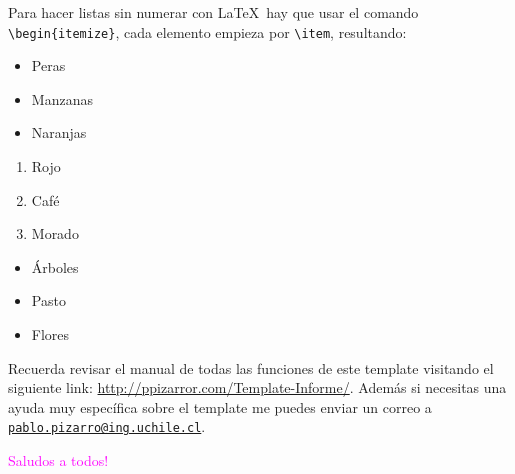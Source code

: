 		Para hacer listas sin numerar con \LaTeX\ hay que usar el comando \texttt{\textbackslash begin\{itemize\}}, cada elemento empieza por \texttt{\textbackslash item}, resultando:
		
		\begin{multicols}{3}
			\begin{itemize}[label={--}]
				\item Peras
				\item Manzanas
				\item Naranjas
			\end{itemize}
			
			\begin{enumerate}[label={*}]
				\item Rojo
				\item Café
				\item Morado
			\end{enumerate}
			
			\begin{itemize}
				\item Árboles
				\item Pasto
				\item Flores
			\end{itemize}
		\end{multicols}
		
		
		Recuerda revisar el manual de todas las funciones de este template visitando el siguiente link: \url{http://ppizarror.com/Template-Informe/}. Además si necesitas una ayuda muy específica sobre el template me puedes enviar un correo a \href{mailto:pablo.pizarro@ing.uchile.cl}{\texttt{pablo.pizarro@ing.uchile.cl}}.
		
		\newp \textcolor{magenta}{Saludos a todos!} \smiley